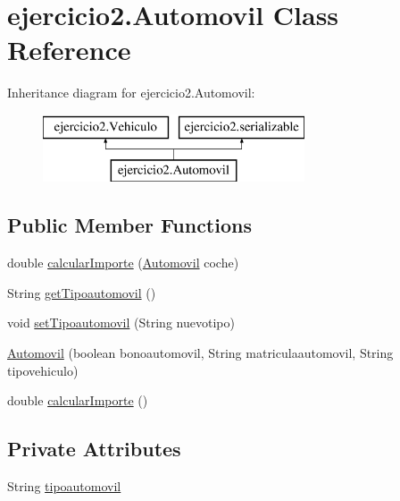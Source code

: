 \hypertarget{classejercicio2_1_1_automovil}{}\section{ejercicio2.\+Automovil Class Reference}
\label{classejercicio2_1_1_automovil}
Inheritance diagram for ejercicio2.\+Automovil\+:\begin{figure}[H]
\begin{center}
\leavevmode
\includegraphics[height=2.000000cm]{classejercicio2_1_1_automovil}
\end{center}
\end{figure}
\subsection*{Public Member Functions}
\begin{DoxyCompactItemize}
\item 
double \mbox{\hyperlink{classejercicio2_1_1_automovil_a7b5c83321312bfd2e91c6acbbc2c6088}{calcular\+Importe}} (\mbox{\hyperlink{classejercicio2_1_1_automovil}{Automovil}} coche)
\item 
String \mbox{\hyperlink{classejercicio2_1_1_automovil_a42400460ead2eae794d19d6f280ddf94}{get\+Tipoautomovil}} ()
\item 
void \mbox{\hyperlink{classejercicio2_1_1_automovil_af3240a070718139a46e75c8878f49d17}{set\+Tipoautomovil}} (String nuevotipo)
\item 
\mbox{\hyperlink{classejercicio2_1_1_automovil_a1c64742023c8ee6815e94cc34dde45aa}{Automovil}} (boolean bonoautomovil, String matriculaautomovil, String tipovehiculo)
\item 
double \mbox{\hyperlink{classejercicio2_1_1_automovil_a41eb8a2004ff16ca01df4dab14dad9b0}{calcular\+Importe}} ()
\end{DoxyCompactItemize}
\subsection*{Private Attributes}
\begin{DoxyCompactItemize}
\item 
String \mbox{\hyperlink{classejercicio2_1_1_automovil_a64abc2717187d18de8f7ef8a86c4b025}{tipoautomovil}}
\end{DoxyCompactItemize}


